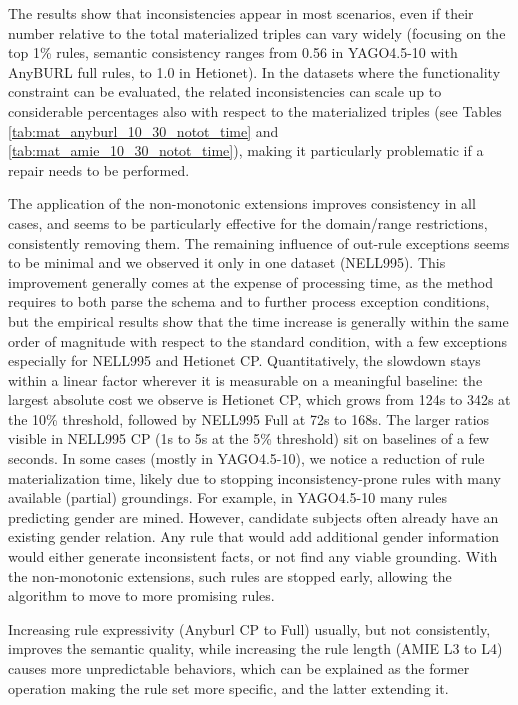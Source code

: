 \documentclass[a4paper,UKenglish,cleveref, autoref, thm-restate]{tgdk-v2021}
\begin{document}
The results show that inconsistencies appear in most scenarios, even if their number relative to the total materialized triples can vary widely (focusing on the top 1\% rules, semantic consistency ranges from 0.56 in YAGO4.5-10 with AnyBURL full rules, to 1.0 in Hetionet). In the datasets where the functionality constraint can be evaluated, the related inconsistencies can scale up to considerable percentages also with respect to the materialized triples (see Tables \ref{tab:mat_anyburl_10_30_notot_time} and \ref{tab:mat_amie_10_30_notot_time}), making it particularly problematic if a repair needs to be performed. 

The application of the non-monotonic extensions improves consistency in all cases, and seems to be particularly effective for the domain/range restrictions, consistently removing them. The remaining influence of out-rule exceptions seems to be minimal and we observed it only in one dataset (NELL995). This improvement generally comes at the expense of processing time, as the method requires to both parse the schema and to further process exception conditions, but the empirical results show that the time increase is generally within the same order of magnitude with respect to the standard condition, with a few exceptions especially for NELL995 and Hetionet CP. Quantitatively, the slowdown stays within a linear factor wherever it is measurable on a meaningful baseline: the largest absolute cost we observe is Hetionet CP, which grows from 124s to 342s at the 10\% threshold, followed by NELL995 Full at 72s to 168s. The larger ratios visible in NELL995 CP (1s to 5s at the 5\% threshold) sit on baselines of a few seconds. In some cases (mostly in YAGO4.5-10), we notice a reduction of rule materialization time, likely due to stopping inconsistency-prone rules with many available (partial) groundings. For example, in YAGO4.5-10 many rules predicting gender are mined. However, candidate subjects often already have an existing gender relation. Any rule that would add additional gender information would either generate inconsistent facts, or not find any viable grounding. With the non-monotonic extensions, such rules are stopped early, allowing the algorithm to move to more promising rules.

Increasing rule expressivity (Anyburl CP to Full) usually, but not consistently, improves the semantic quality, while increasing the rule length (AMIE L3 to L4) causes more unpredictable behaviors, which can be explained as the former operation making the rule set more specific, and the latter extending it. 
\end{document}
